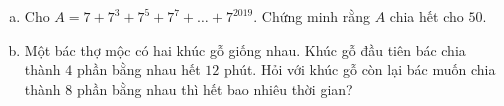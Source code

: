 \begin{ex}
	\begin{enumerate}[a)]
	\item Cho $A=7+7^{3}+7^{5}+7^{7}+\ldots+7^{2019}$. Chứng minh rằng $A$ chia hết cho $50$.
	\item Một bác thợ mộc có hai khúc gỗ giống nhau. Khúc gỗ đầu tiên bác chia thành $4$ phần bằng nhau hết $12$ phút. Hỏi với khúc gỗ còn lại bác muốn chia thành $8$ phần bằng nhau thì hết bao nhiêu thời gian?
	\end{enumerate}
\end{ex}